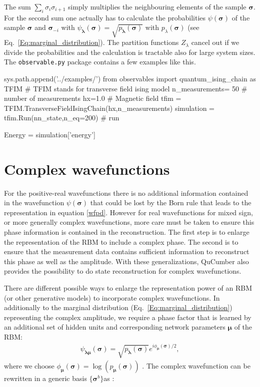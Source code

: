 \documentclass[submission, Phys]{SciPost}
\begin{document}
The sum $\sum_i \sigma_i \sigma_{i+1}$ simply multiplies the neighbouring elements of the sample $\bm{\sigma}$. For the second sum one actually has to calculate the probabilities $\psi (\bm{\sigma})$ of the sample $\bm{\sigma}$ and $\bm{\sigma}_{-i} $ with
$\psi_{\bm{\lambda}}(\bm{\sigma}) = \sqrt{p_{\bm{\lambda}}(\bm{\sigma})}$
with $p_{\lambda}(\bm{\sigma})$ (see Eq.~\ref{Eq:marginal_distribution}). The partition functions $Z_{\lambda}$ cancel out if we divide the probabilities and the calculation is tractable also for large system sizes.
The \verb|observable.py| package contains a few examples like this.

\begin{python}
	sys.path.append('../examples/')
	from observables import quantum_ising_chain as TFIM
	# TFIM stands for transverse field ising model
	n_measurements= 50 # number of measurements
	hx=1.0       # Magnetic field
	tfim = TFIM.TransverseFieldIsingChain(hx,n_measurements)
	simulation = tfim.Run(nn_state,n_eq=200) # run

	Energy = simulation['energy']
\end{python}



\section{Complex wavefunctions}
\label{Sec:Training_QuCumber_on_complex_wavefunctions}

For the positive-real wavefunctions there is no additional information contained in the wavefunction
$\psi( \boldsymbol{\sigma})$ that could be lost by the Born rule that leads to the representation in equation \ref{wfpd}.
However for real wavefunctions for mixed sign, or more generally complex wavefunctions, more care must be taken to ensure 
this phase information is contained in the reconstruction.  The first step is to enlarge the representation of the RBM to 
include a complex phase.  The second is to ensure that the measurement data contains sufficient information to reconstruct
this phase as well as the amplitude.  With these generalizations, QuCumber also provides the possibility to do state reconstruction for complex wavefunctions.

There are different possible ways to enlarge the representation power of an RBM (or other generative models) to 
incorporate complex wavefunctions.  
In additionally to the marginal distribution (Eq.~\ref{Eq:marginal_distribution}) representing the complex amplitude,
we require a phase factor that is learned by an additional set of hidden units and corresponding network parameters $\bm{\mu}$ of the RBM:
\begin{align}
	\psi_{\bm{\lambda} \bm{\mu}} (\bm{\sigma})= \sqrt{p_{\bm{\lambda}} (\bm{\sigma})} e^{i \phi_{\bm{\mu}} (\bm{\sigma})/2},
\end{align}
%
where we choose $\phi_{\bm{\mu}}(\bm{\sigma}) = \log (p_{\bm{\mu}} (\bm{\sigma}))$ \cite{torlai2018tomography}. 
The complex wavefunction can be rewritten in a generic basis $\{ \bm{\sigma}^b \}$as :
\end{document}
